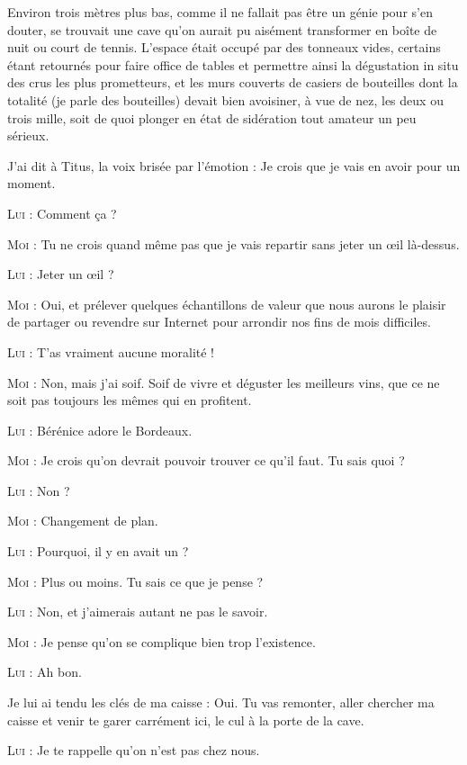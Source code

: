 Environ trois mètres plus bas, comme il ne fallait pas être un génie pour s’en douter, se trouvait une cave qu’on aurait pu aisément transformer en boîte de nuit ou court de tennis. L’espace était occupé par des tonneaux vides, certains étant retournés pour faire office de tables et permettre ainsi la dégustation in situ des crus les plus prometteurs, et les murs couverts de casiers de bouteilles dont la totalité (je parle des bouteilles) devait bien avoisiner, à vue de nez, les deux ou trois mille, soit de quoi plonger en état de sidération tout amateur un peu sérieux.

\begin{dialogue}

J’ai dit à Titus, la voix brisée par l’émotion : Je crois que je vais en avoir pour un moment.

\textsc{Lui} : Comment ça ?

\textsc{Moi} : Tu ne crois quand même pas que je vais repartir sans jeter un œil là-dessus.

\textsc{Lui} : Jeter un œil ?

\textsc{Moi} : Oui, et prélever quelques échantillons de valeur que nous aurons le plaisir de partager ou revendre sur Internet pour arrondir nos fins de mois difficiles.

\textsc{Lui} : T’as vraiment aucune moralité !

\textsc{Moi} : Non, mais j’ai soif. Soif de vivre et déguster les meilleurs vins, que ce ne soit pas toujours les mêmes qui en profitent.

\textsc{Lui} : Bérénice adore le Bordeaux.

\textsc{Moi} : Je crois qu’on devrait pouvoir trouver ce qu’il faut. Tu sais quoi ?

\textsc{Lui} : Non ?

\textsc{Moi} : Changement de plan.

\textsc{Lui} : Pourquoi, il y en avait un ?

\textsc{Moi} : Plus ou moins. Tu sais ce que je pense ?

\textsc{Lui} : Non, et j’aimerais autant ne pas le savoir.

\textsc{Moi} : Je pense qu’on se complique bien trop l’existence.

\textsc{Lui} : Ah bon.

Je lui ai tendu les clés de ma caisse : Oui. Tu vas remonter, aller chercher ma caisse et venir te garer carrément ici, le cul à la porte de la cave.

\textsc{Lui} : Je te rappelle qu’on n’est pas chez nous.


\end{dialogue}
